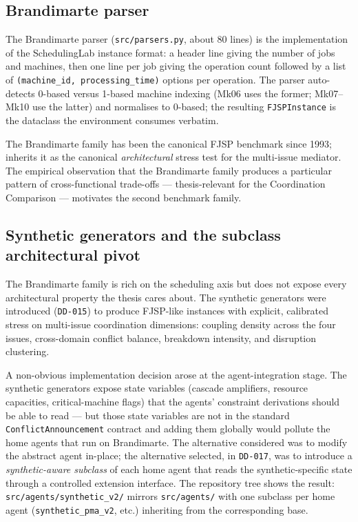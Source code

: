 \subsection{Brandimarte parser}

The Brandimarte parser (\texttt{src/parsers.py}, about 80 lines) is the
implementation of the SchedulingLab instance format: a header line
giving the number of jobs and machines, then one line per job giving
the operation count followed by a list of \texttt{(machine\_id,
processing\_time)} options per operation. The parser auto-detects
0-based versus 1-based machine indexing (Mk06 uses the former; Mk07--Mk10
use the latter) and normalises to 0-based; the resulting
\texttt{FJSPInstance} is the dataclass the environment consumes
verbatim.

The Brandimarte family has been the canonical FJSP benchmark since
1993; \NEXUS{} inherits it as the canonical \emph{architectural} stress
test for the multi-issue mediator. The empirical observation that the
Brandimarte family produces a particular pattern of cross-functional
trade-offs --- thesis-relevant for the Coordination Comparison ---
motivates the second benchmark family.

\subsection{Synthetic generators and the subclass architectural pivot}
\label{subsec:impl-synthpivot}

The Brandimarte family is rich on the scheduling axis but does not
expose every architectural property the thesis cares about. The
synthetic generators were introduced (\texttt{DD-015}) to produce
FJSP-like instances with explicit, calibrated stress on multi-issue
coordination dimensions: coupling density across the four issues,
cross-domain conflict balance, breakdown intensity, and disruption
clustering.

A non-obvious implementation decision arose at the agent-integration
stage. The synthetic generators expose state variables (cascade
amplifiers, resource capacities, critical-machine flags) that the
agents' constraint derivations should be able to read --- but those
state variables are not in the standard \texttt{ConflictAnnouncement}
contract and adding them globally would pollute the home agents that
run on Brandimarte. The alternative considered was to modify the
abstract agent in-place; the alternative selected, in \texttt{DD-017},
was to introduce a \emph{synthetic-aware subclass} of each home agent
that reads the synthetic-specific state through a controlled extension
interface. The repository tree shows the result:
\texttt{src/agents/synthetic\_v2/} mirrors \texttt{src/agents/} with one
subclass per home agent (\texttt{synthetic\_pma\_v2}, etc.) inheriting
from the corresponding base.

